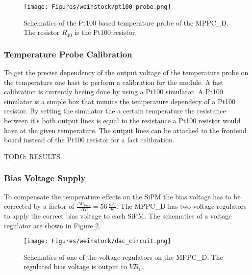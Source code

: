 \documentclass[]{article}
\begin{document}
	\begin{figure}[t]
		\centering
			\texttt{[image: Figures/weinstock/pt100\_probe.png]}
		\caption{Schematics of the Pt100 based temperature probe of the MPPC\_D. The resistor $R_{10}$ is the Pt100 resistor.}
		\label{pt100_probe}
	\end{figure}	
 
\subsubsection{Temperature Probe Calibration}

To get the precise dependency of the output voltage of the temperature probe on the temperature one hast to perform a calibration for the module. A fast calibration is currently beeing
done by using a Pt100 simulator. A Pt100 simulator is a simple box that mimics the temperature dependecy of a Pt100 resistor. By setting the simulator the a certain temperature the 
resistance between it's both output lines is equal to the resistance a Pt100 resistor would have at the given temperature. The output lines can be attached to the frontend board
instead of the Pt100 resistor for a fast calibration.

TODO: RESULTS

\newpage

\subsubsection{Bias Voltage Supply}

To compensate the temperature effects on the SiPM the bias voltage has to be corrected by a factor of $\frac{\Delta U_{bias}}{\Delta T} = 56\,\frac{mV}{K}$. The MPPC\_D has two 
voltage regulators to apply the correct bias voltage to each SiPM. The schematics of a voltage regulator are shown in Figure \ref{voltage_regulator}. 
	
	\begin{figure}[t]
		\centering
			\texttt{[image: Figures/weinstock/dac\_circuit.png]}
		\caption{Schematics of one of the voltage regulators on the MPPC\_D. The regulated bias voltage is output to $VB_1$.}
		\label{voltage_regulator}
	\end{figure}	
\end{document}
